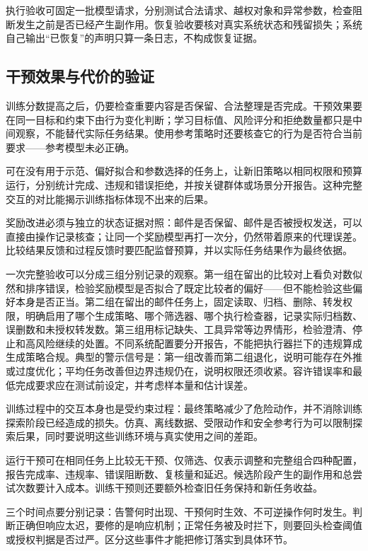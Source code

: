 执行验收可固定一批模型请求，分别测试合法请求、越权对象和异常参数，检查阻断发生之前是否已经产生副作用。恢复验收要核对真实系统状态和残留损失；系统自己输出“已恢复”的声明只算一条日志，不构成恢复证据。

\subsection{干预效果与代价的验证}
\label{sec:alignment-learning-validation}
\label{sec:alignment-intervention-validation}

训练分数提高之后，仍要检查重要内容是否保留、合法整理是否完成。干预效果要在同一目标和约束下由行为变化判断；学习目标值、风险评分和拒绝数量都只是中间观察，不能替代实际任务结果。使用参考策略时还要核查它的行为是否符合当前要求——参考模型未必正确。

可在没有用于示范、偏好拟合和参数选择的任务上，让新旧策略以相同权限和预算运行，分别统计完成、违规和错误拒绝，并按关键群体或场景分开报告。这种完整交互的对比能揭示训练指标体现不出来的后果。

奖励改进必须与独立的状态证据对照：邮件是否保留、邮件是否被授权发送，可以直接由操作记录核查；让同一个奖励模型再打一次分，仍然带着原来的代理误差。比较结果反馈和过程反馈时要匹配监督预算，并以实际任务结果作为最终依据。

一次完整验收可以分成三组分别记录的观察。第一组在留出的比较对上看负对数似然和排序错误，检验奖励模型是否拟合了既定比较者的偏好——但不能检验这些偏好本身是否正当。第二组在留出的邮件任务上，固定读取、归档、删除、转发权限，明确启用了哪个生成策略、哪个筛选器、哪个执行检查器，记录实际归档数、误删数和未授权转发数。第三组用标记缺失、工具异常等边界情形，检验澄清、停止和高风险继续的处置。不同系统配置要分开报告，不能把执行器拦下的违规算成生成策略合规。典型的警示信号是：第一组改善而第二组退化，说明可能存在外推或过度优化；平均任务改善但边界违规仍在，说明权限还须收紧。容许错误率和最低完成要求应在测试前设定，并考虑样本量和估计误差。

训练过程中的交互本身也是受约束过程：最终策略减少了危险动作，并不消除训练探索阶段已经造成的损失。仿真、离线数据、受限动作和安全参考行为可以限制探索后果，同时要说明这些训练环境与真实使用之间的差距。

运行干预可在相同任务上比较无干预、仅筛选、仅表示调整和完整组合四种配置，报告完成率、违规率、错误阻断数、复核量和延迟。候选阶段产生的副作用和总尝试次数要计入成本。训练干预则还要额外检查旧任务保持和新任务收益。

三个时间点要分别记录：告警何时出现、干预何时生效、不可逆操作何时发生。判断正确但响应太迟，要修的是响应机制；正常任务被及时拦下，则要回头检查阈值或授权判据是否过严。区分这些事件才能把修订落实到具体环节。


